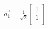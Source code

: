 \documentclass[preview]{standalone}
\begin{document}
\begin{align*}
\vec{a_1} = \frac{1}{\sqrt{2}} \left[{\begin{array}{cc} 1 \\ 1 \\ \end{array}} \right]
\end{align*}
\end{document}
